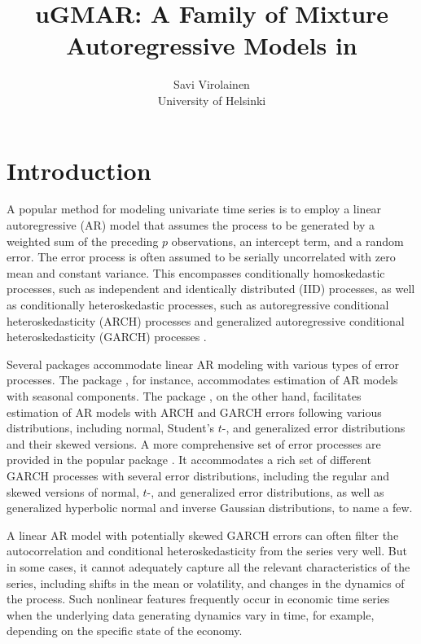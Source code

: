 \documentclass[nojss]{jss} %
\author{Savi Virolainen\\ University of Helsinki}
\title{uGMAR: A Family of Mixture Autoregressive Models in \proglang{R}}
\begin{document}
\section{Introduction}
A popular method for modeling univariate time series is to employ a linear autoregressive (AR) model that assumes the process to be generated by a weighted sum of the preceding $p$ observations, an intercept term, and a random error. The error process is often assumed to be serially uncorrelated with zero mean and constant variance. This encompasses conditionally homoskedastic processes, such as independent and identically distributed (IID) processes, as well as conditionally heteroskedastic processes, such as autoregressive conditional heteroskedasticity (ARCH) processes \citep{Engle:1982} and generalized autoregressive conditional heteroskedasticity (GARCH) processes \citep{Bollerslev:1986}.

Several  packages accommodate linear AR modeling with various types of error processes. The  package  \citep{Hyndman+Athanasopoulos+Bergmeir+Caceres+Chhay+O'Hara-Wild+Petropoulos+Razbash+Wang+Yasmeen:2021}, for instance, accommodates estimation of AR models with seasonal components. The  package  \citep{Wuertz+Chalabi+Boudt+Chausse+Miklovac:2020}, on the other hand, facilitates estimation of AR models with ARCH and GARCH errors following various distributions, including normal, Student's $t$-, and generalized error distributions and their skewed versions. A more comprehensive set of error processes are provided in the popular  package  \citep{Ghalanos:2020}. It accommodates a rich set of different GARCH processes with several error distributions, including the regular and skewed versions of normal, $t$-, and generalized error distributions, as well as generalized hyperbolic normal and inverse Gaussian distributions, to name a few.

A linear AR model with potentially skewed GARCH errors can often filter the autocorrelation and conditional heteroskedasticity from the series very well. But in some cases, it cannot adequately capture all the relevant characteristics of the series, including
shifts in the mean or volatility, and changes in the dynamics of the process. Such nonlinear features frequently occur in economic time series when the underlying data generating dynamics vary in time, for example, depending on the specific state of the economy.
\end{document}
